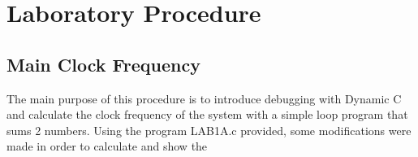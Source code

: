 \section{Laboratory Procedure}

\subsection{Main Clock Frequency}

The main purpose of this procedure is to introduce debugging with Dynamic C and calculate the clock frequency of the system with a simple loop program that sums 2 numbers. Using the program LAB1A.c provided, some modifications were made in order to calculate and show the 